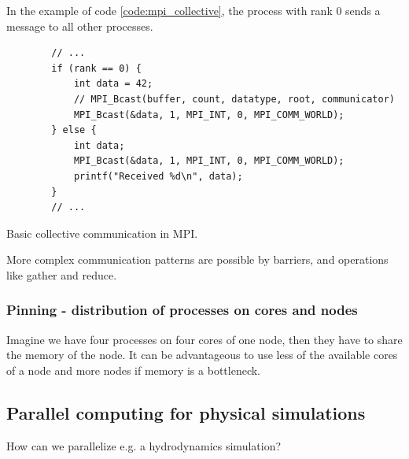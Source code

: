 In the example of code \ref{code:mpi_collective}, the process with rank $0$ sends
a message to all other processes.

\begin{codebox}[!htb]
    \begin{verbatim}
        // ...
        if (rank == 0) {
            int data = 42;
            // MPI_Bcast(buffer, count, datatype, root, communicator)
            MPI_Bcast(&data, 1, MPI_INT, 0, MPI_COMM_WORLD);
        } else {
            int data;
            MPI_Bcast(&data, 1, MPI_INT, 0, MPI_COMM_WORLD);
            printf("Received %d\n", data);
        }
        // ...
    \end{verbatim}
    \caption{Basic collective communication in MPI.}
    \label{code:mpi_collective}
\end{codebox}

More complex communication patterns are possible by barriers, and operations
like gather and reduce.

\subsubsection{Pinning - distribution of processes on cores and nodes}
Imagine we have four processes on four cores of one node, then they have to share
the memory of the node. It can be advantageous to use less of the available cores
of a node and more nodes if memory is a bottleneck.

\subsection{Parallel computing for physical simulations}
How can we parallelize e.g. a hydrodynamics simulation?
